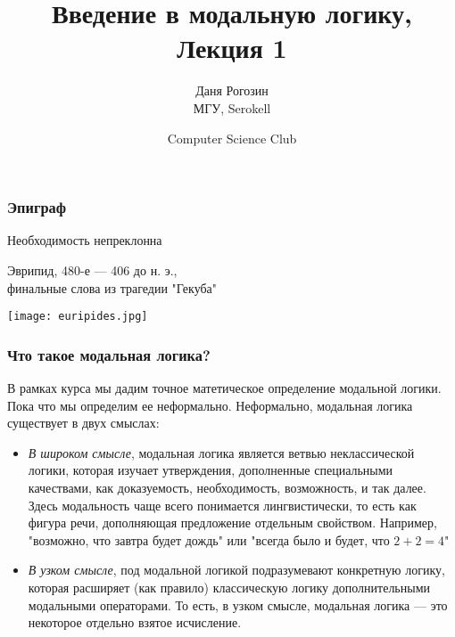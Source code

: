 \documentclass[pdf,utf8,russian,aspectratio=169]{beamer}
\title{Введение в модальную логику, \\ Лекция 1}
\author{Даня Рогозин \\ МГУ, Serokell}
\date{Computer Science Club}
\begin{document}
\maketitle

\begin{frame}
  \frametitle{Эпиграф}

  \begin{center}
    Необходимость непреклонна

\vspace{\baselineskip}

    Эврипид, 480-е --- 406 до н. э., \\
    финальные слова из трагедии "Гекуба"
  \end{center}
  \begin{center}
  \texttt{[image: euripides.jpg]}
  \end{center}
\end{frame}

\begin{frame}
  \frametitle{Что такое модальная логика?}

  В рамках курса мы дадим точное матетическое определение модальной логики. Пока что мы определим ее неформально.
  Неформально, модальная логика существует в двух смыслах:

  \begin{itemize}
    \item \emph{В широком смысле}, модальная логика является ветвью неклассической логики, которая изучает
    утверждения, дополненные специальными качествами, как доказуемость, необходимость, возможность, и так далее.
    Здесь модальность чаще всего понимается лингвистически, то есть как фигура речи, дополняющая предложение отдельным свойством. Например, "возможно, что завтра будет дождь" или "всегда было и будет, что $2 + 2 = 4$"
    \item \emph{В узком смысле}, под модальной логикой подразумевают конкретную логику, которая расширяет (как правило) классическую логику дополнительными модальными операторами. То есть, в узком смысле, модальная логика --- это некоторое отдельно взятое исчисление.
  \end{itemize}
\end{frame}
\end{document}
